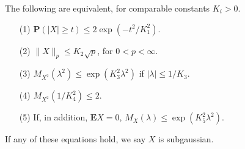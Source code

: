 \begin{theorem}
    The following are equivalent, for comparable constants $K_i > 0$.
    \begin{enumerate}
        \item[(1)] $\mathbf{P}(|X| \geq t) \leq 2 \exp(-t^2/K_1^2)$.
        \item[(2)] $\| X \|_p \leq K_2 \sqrt{p}$, for $0 < p < \infty$.
        \item[(3)] $M_{X^2}(\lambda^2) \leq \exp(K_3^2 \lambda^2)$ if $|\lambda| \leq 1/K_3$.
        \item[(4)] $M_{X^2}(1/K_4^2) \leq 2$.
        \item[(5)] If, in addition, $\mathbf{E} X = 0$, $M_X(\lambda) \leq \exp(K_5^2 \lambda^2)$.
    \end{enumerate}
    If any of these equations hold, we say $X$ is subgaussian.
\end{theorem}
